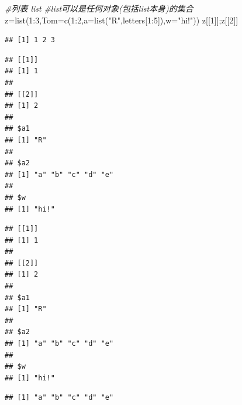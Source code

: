 \documentclass[
]{book}
\newenvironment{Shaded}{\begin{snugshade}}{\end{snugshade}}
\newcommand{\AttributeTok}[1]{\textcolor[rgb]{0.77,0.63,0.00}{#1}}
\newcommand{\CommentTok}[1]{\textcolor[rgb]{0.56,0.35,0.01}{\textit{#1}}}
\newcommand{\DecValTok}[1]{\textcolor[rgb]{0.00,0.00,0.81}{#1}}
\newcommand{\FunctionTok}[1]{\textcolor[rgb]{0.00,0.00,0.00}{#1}}
\newcommand{\NormalTok}[1]{#1}
\newcommand{\OtherTok}[1]{\textcolor[rgb]{0.56,0.35,0.01}{#1}}
\newcommand{\SpecialCharTok}[1]{\textcolor[rgb]{0.00,0.00,0.00}{#1}}
\newcommand{\StringTok}[1]{\textcolor[rgb]{0.31,0.60,0.02}{#1}}
\begin{document}
\begin{Shaded}
\begin{Highlighting}[]
\CommentTok{\#列表 list}
\CommentTok{\#list可以是任何对象(包括list本身)的集合}
\NormalTok{z}\OtherTok{=}\FunctionTok{list}\NormalTok{(}\DecValTok{1}\SpecialCharTok{:}\DecValTok{3}\NormalTok{,}\AttributeTok{Tom=}\FunctionTok{c}\NormalTok{(}\DecValTok{1}\SpecialCharTok{:}\DecValTok{2}\NormalTok{,}\AttributeTok{a=}\FunctionTok{list}\NormalTok{(}\StringTok{"R"}\NormalTok{,letters[}\DecValTok{1}\SpecialCharTok{:}\DecValTok{5}\NormalTok{]),}\AttributeTok{w=}\StringTok{"hi!"}\NormalTok{))}
\NormalTok{z[[}\DecValTok{1}\NormalTok{]];z[[}\DecValTok{2}\NormalTok{]]}
\end{Highlighting}
\end{Shaded}

\begin{verbatim}
## [1] 1 2 3
\end{verbatim}

\begin{verbatim}
## [[1]]
## [1] 1
## 
## [[2]]
## [1] 2
## 
## $a1
## [1] "R"
## 
## $a2
## [1] "a" "b" "c" "d" "e"
## 
## $w
## [1] "hi!"
\end{verbatim}

\begin{Shaded}
\end{Shaded}

\begin{verbatim}
## [[1]]
## [1] 1
## 
## [[2]]
## [1] 2
## 
## $a1
## [1] "R"
## 
## $a2
## [1] "a" "b" "c" "d" "e"
## 
## $w
## [1] "hi!"
\end{verbatim}

\begin{Shaded}
\end{Shaded}

\begin{verbatim}
## [1] "a" "b" "c" "d" "e"
\end{verbatim}

\begin{Shaded}
\end{Shaded}
\end{document}
